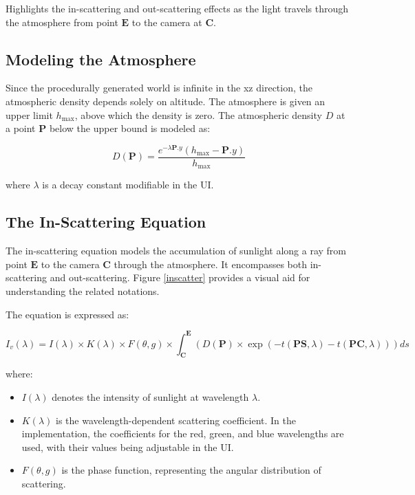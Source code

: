 {Highlights the in-scattering and out-scattering effects as the light travels through the atmosphere from point $\mathbf{E}$ to the camera at $\mathbf{C}$.}


\subsection{Modeling the Atmosphere}

Since the procedurally generated world is infinite in the xz direction, the atmospheric density depends solely on altitude. The atmosphere is given an upper limit $h_{\text{max}}$, above which the density is zero. The atmospheric density $D$ at a point $\mathbf{P}$ below the upper bound is modeled as:

\begin{equation}
    D(\mathbf{P})=\frac{e^{-\lambda \mathbf{P}.y}\left(h_{\text{max}}-\mathbf{P}.y\right)}{h_{\text{max}}}
\end{equation}

where $\lambda$ is a decay constant modifiable in the UI.

\subsection{The In-Scattering Equation}
\label{The In-Scattering Equation}

The in-scattering equation models the accumulation of sunlight along a ray from point $\mathbf{E}$ to the camera $\mathbf{C}$ through the atmosphere. It encompasses both in-scattering and out-scattering. Figure \ref{inscatter} provides a visual aid for understanding the related notations.

The equation is expressed as:

\begin{equation}
    I_v(\lambda) = I(\lambda) \times K(\lambda) \times F(\theta, g) \times \int_{\mathbf{C}}^{\mathbf{E}} \left( D(\mathbf{P}) \times \exp\left(-t\left({{\mathbf{PS}},\lambda}\right) -t \left({{\mathbf{PC}},\lambda}\right) \right)\right) ds
\end{equation}

where:
\begin{itemize}
    \item $I(\lambda)$ denotes the intensity of sunlight at wavelength $\lambda$.
    \item $K(\lambda)$ is the wavelength-dependent scattering coefficient. In the implementation, the coefficients for the red, green, and blue wavelengths are used, with their values being adjustable in the UI.
    \item $F(\theta, g)$ is the phase function, representing the angular distribution of scattering.
\end{itemize}


